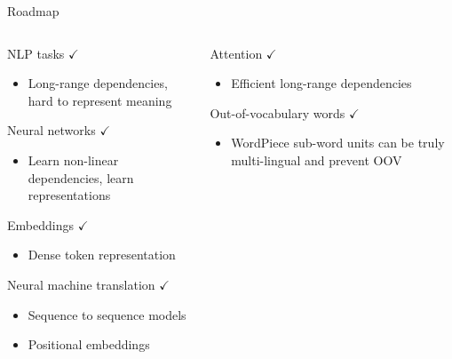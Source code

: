 \documentclass[12pt,aspectratio=169,handout]{beamer}
\begin{document}
\begin{frame}{Roadmap}
	
	\begin{columns}
		
		\begin{column}{0.5\linewidth}
			
			
			NLP tasks $\checkmark$
			
			\begin{itemize}
				\item {\scriptsize Long-range dependencies, hard to represent meaning}
			\end{itemize}
			
			Neural networks $\checkmark$
			
			\begin{itemize}
				\item {\scriptsize Learn non-linear dependencies, learn representations}
			\end{itemize}
			
			Embeddings $\checkmark$
			
			\begin{itemize}
				\item {\scriptsize Dense token representation}
			\end{itemize}
			
			Neural machine translation $\checkmark$
			
			\begin{itemize}
				\item {\scriptsize Sequence to sequence models}
				\item {\scriptsize Positional embeddings}
			\end{itemize}
			
		\end{column}
		
		\begin{column}{0.5\linewidth}
			
			Attention $\checkmark$
			
			\begin{itemize}
				\item {\scriptsize Efficient long-range dependencies}
			\end{itemize}
			
			
			Out-of-vocabulary words $\checkmark$
			
			\begin{itemize}
				\item {\scriptsize WordPiece sub-word units can be truly multi-lingual and prevent OOV}
			\end{itemize}
			
			
			
		\end{column}
		
	\end{columns}
	
\end{frame}
\end{document}

